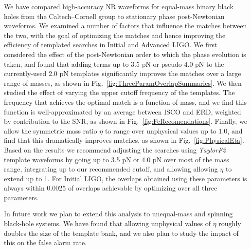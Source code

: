 We have compared high-accuracy NR waveforms for equal-mass binary
black holes from the Caltech--Cornell group to stationary phase
post-Newtonian waveforms.  We examined a number of factors that
influence the matches between the two, with the goal of optimizing the
matches and hence improving the efficiency of templated searches in
Initial and Advanced LIGO.  We first considered the effect of the
post-Newtonian order to which the phase evolution is taken, and found
that adding terms up to 3.5 pN or pseudo-4.0 pN to the currently-used
2.0 pN templates significantly improves the matches over a large range
of masses, as shown in Fig.~\ref{fig:ThreeParamOverlapSummaries}.  We
then studied the effect of varying the upper cutoff frequency of the
templates.  The frequency that achieves the optimal match is a
function of mass, and we find this function is well-approximated by an
average between ISCO and ERD, weighted by contribution to the SNR, as
shown in Fig.~\ref{fig:FcRecomendations}.  Finally, we allow the
symmetric mass ratio $\eta$ to range over unphysical values up to
$1.0$, and find that this dramatically improves matches, as shown in
Fig.~\ref{fig:PhysicalEta}.  Based on the results we recommend
adjusting the searches using \textit{TaylorF2} template waveforms by
going up to 3.5 pN or 4.0 pN over most of the mass range, integrating
up to our recommended cutoff, and allowing allowing $\eta$ to extend
up to 1.  For Initial LIGO, the overlaps obtained using these
parameters is always within 0.0025 of overlaps achievable by
optimizing over all three parameters.

In future work we plan to extend this analysis to unequal-mass and
spinning black-hole systems.  We have found that allowing unphysical
values of $\eta$ roughly doubles the size of the template bank, and we
also plan to study the impact of this on the false alarm rate.



